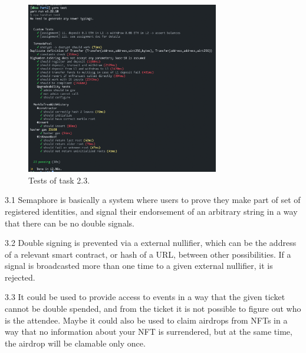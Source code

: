 \documentclass{article}
\begin{document}
\begin{figure}
    \centering
    \includegraphics[width=0.75\textwidth]{img2.png}
    \caption*{Tests of task 2.3.}
\end{figure}

3.1 Semaphore is basically a system where users to prove they make part of set of registered identities, and signal their endorsement of an arbitrary string in a way that there can be no double signals.

3.2 Double signing is prevented via a external nullifier, which can be the address of a relevant smart contract, or hash of a URL, between other possibilities. If a signal is broadcasted more than one time to a given external nullifier, it is rejected.

3.3 It could be used to provide access to events in a way that the given ticket cannot be double spended, and from the ticket it is not possible to figure out who is the attendee. Maybe it could also be used to claim airdrops from NFTs in a way that no information about your NFT is surrendered, but at the same time, the airdrop will be clamable only once.
\end{document}
